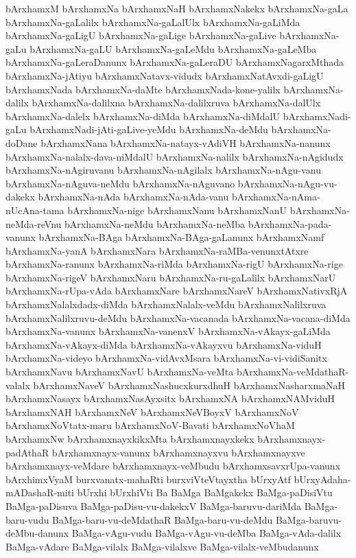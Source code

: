 {bArxhamxM
bArxhamxNa
bArxhamxNaH
bArxhamxNakekx
bArxhamxNa-gaLa
bArxhamxNa-gaLalilx
bArxhamxNa-gaLalUlx
bArxhamxNa-gaLiMda
bArxhamxNa-gaLigU
bArxhamxNa-gaLige
bArxhamxNa-gaLive
bArxhamxNa-gaLu
bArxhamxNa-gaLU
bArxhamxNa-gaLeMdu
bArxhamxNa-gaLeMba
bArxhamxNa-gaLeraDanunx
bArxhamxNa-gaLeraDU
bArxhamxNagarxMthada
bArxhamxNa-jAtiyu
bArxhamxNatavx-vidudx
bArxhamxNatAvxdi-gaLigU
bArxhamxNada
bArxhamxNa-daMte
bArxhamxNada-kone-yalilx
bArxhamxNa-dalilx
bArxhamxNa-dalilxna
bArxhamxNa-dalilxruva
bArxhamxNa-dalUlx
bArxhamxNa-dalelx
bArxhamxNa-diMda
bArxhamxNa-diMdalU
bArxhamxNadi-gaLu
bArxhamxNadi-jAti-gaLive-yeMdu
bArxhamxNa-deMdu
bArxhamxNa-doDane
bArxhamxNana
bArxhamxNa-natayx-vAdiVH
bArxhamxNa-nanunx
bArxhamxNa-nalalx-dava-niMdalU
bArxhamxNa-nalilx
bArxhamxNa-nAgidudx
bArxhamxNa-nAgiruvanu
bArxhamxNa-nAgilalx
bArxhamxNa-nAgu-vanu
bArxhamxNa-nAguva-neMdu
bArxhamxNa-nAguvano
bArxhamxNa-nAgu-vu-dakekx
bArxhamxNa-nAda
bArxhamxNa-nAda-vanu
bArxhamxNa-nAma-nUcAna-tama
bArxhamxNa-nige
bArxhamxNanu
bArxhamxNanU
bArxhamxNa-neMda-reVnu
bArxhamxNa-neMdu
bArxhamxNa-neMba
bArxhamxNa-pada-vanunx
bArxhamxNa-BAga
bArxhamxNa-BAga-gaLanunx
bArxhamxNamf
bArxhamxNa-yanA
bArxhamxNara
bArxhamxNa-raMBa-venunxtAtxre
bArxhamxNa-ranunx
bArxhamxNa-riMda
bArxhamxNa-rigU
bArxhamxNa-rige
bArxhamxNa-rigeV
bArxhamxNaru
bArxhamxNa-ru-gaLalilx
bArxhamxNarU
bArxhamxNa-rUpa-vAda
bArxhamxNare
bArxhamxNareV
bArxhamxNativxRjA
bArxhamxNalalxdadx-diMda
bArxhamxNalalx-veMdu
bArxhamxNalilxruva
bArxhamxNalilxruvu-deMdu
bArxhamxNa-vacanada
bArxhamxNa-vacana-diMda
bArxhamxNa-vanunx
bArxhamxNa-vanenxV
bArxhamxNa-vAkayx-gaLiMda
bArxhamxNa-vAkayx-diMda
bArxhamxNa-vAkayxvu
bArxhamxNa-viduH
bArxhamxNa-videyo
bArxhamxNa-vidAvxMsara
bArxhamxNa-vi-vidiSanitx
bArxhamxNavu
bArxhamxNavU
bArxhamxNa-veMta
bArxhamxNa-veMdathaR-valalx
bArxhamxNaveV
bArxhamxNashucxkurxdhuH
bArxhamxNasharxmaNaH
bArxhamxNasayx
bArxhamxNasAyxsitx
bArxhamxNA
bArxhamxNAMviduH
bArxhamxNAH
bArxhamxNeV
bArxhamxNeVBoyxV
bArxhamxNoV
bArxhamxNoVtatx-maru
bArxhamxNoV-Bavati
bArxhamxNoVhaM
bArxhamxNw
bArxhamxnayxkikxMta
bArxhamxnayxkekx
bArxhamxnayx-padAthaR
bArxhamxnayx-vanunx
bArxhamxnayxvu
bArxhamxnayxve
bArxhamxnayx-veMdare
bArxhamxnayx-veMbudu
bArxhamxsavxrUpa-vanunx
bArxhimxVyaM
burxvanatx-mahaRti
burxviVteVtayxtha
bUrxyAtf
bUrxyAdaha-mADashaR-miti
bUrxhi
bUrxhiVti
Ba
BaMga
BaMgakekx
BaMga-paDisiVtu
BaMga-paDisuva
BaMga-paDisu-vu-dakekxV
BaMga-baruvu-dariMda
BaMga-baru-vudu
BaMga-baru-vu-deMdathaR
BaMga-baru-vu-deMdu
BaMga-baruvu-deMbu-danunx
BaMga-vAgu-vudu
BaMga-vAgu-vu-deMba
BaMga-vAda-dalilx
BaMga-vAdare
BaMga-vilalx
BaMga-vilalxve
BaMga-vilalx-veMbudanunx
}
